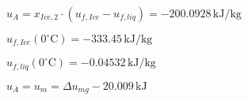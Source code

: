 \( u_A = x_{Ice,2} \cdot (u_{f,Ice} - u_{f,liq}) = -200.0928 \, \text{kJ/kg} \)  

\( u_{f,Ice}(0^\circ \text{C}) = -333.45 \, \text{kJ/kg} \)  

\( u_{f,liq}(0^\circ \text{C}) = -0.04532 \, \text{kJ/kg} \)  

\( u_A = u_m = \Delta u_{mg} - 20.009 \, \text{kJ} \)